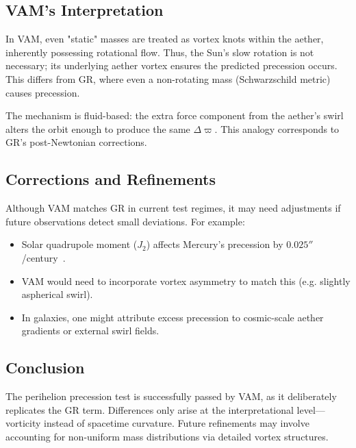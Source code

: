 \subsection*{VAM’s Interpretation}
In VAM, even "static" masses are treated as vortex knots within the aether, inherently possessing rotational flow. Thus, the Sun’s slow rotation is not necessary; its underlying aether vortex ensures the predicted precession occurs. This differs from GR, where even a non-rotating mass (Schwarzschild metric) causes precession.

The mechanism is fluid-based: the extra force component from the aether's swirl alters the orbit enough to produce the same $\Delta \varpi$. This analogy corresponds to GR’s post-Newtonian corrections.

\subsection*{Corrections and Refinements}
Although VAM matches GR in current test regimes, it may need adjustments if future observations detect small deviations. For example:
\begin{itemize}
    \item Solar quadrupole moment ($J_2$) affects Mercury’s precession by $0.025''$/century~\cite{sereno2006solar}.
    \item VAM would need to incorporate vortex asymmetry to match this (e.g. slightly aspherical swirl).
    \item In galaxies, one might attribute excess precession to cosmic-scale aether gradients or external swirl fields.
\end{itemize}

\subsection*{Conclusion}
The perihelion precession test is successfully passed by VAM, as it deliberately replicates the GR term. Differences only arise at the interpretational level—vorticity instead of spacetime curvature. Future refinements may involve accounting for non-uniform mass distributions via detailed vortex structures.